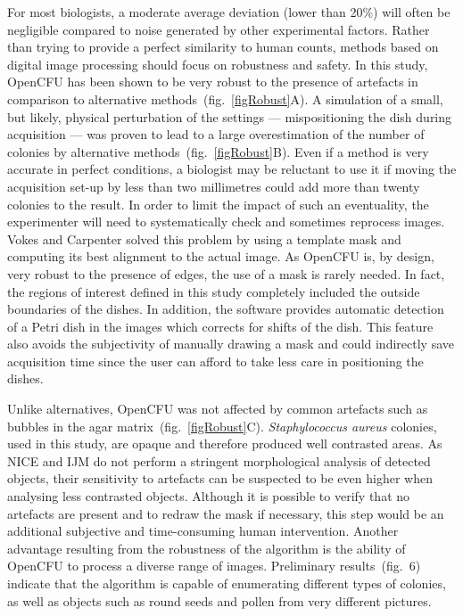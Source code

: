 \documentclass[10pt]{article}
\newcommand{\sa}{\emph{Staphylococcus aureus}}
\newcommand{\IJM}{IJM}
\begin{document}
For most biologists, a moderate average deviation (lower than 20\%) will often be
negligible compared to noise generated by other experimental factors.
Rather than trying to provide a perfect similarity to human counts, methods
based on digital image processing should focus on robustness and safety.
In this study, OpenCFU has been shown to be very robust to the presence of
artefacts in comparison to alternative methods~(fig.~\ref{figRobust}A). A
simulation of a small, but likely, physical perturbation of the settings ---
mispositioning the dish during acquisition --- was proven to lead to a large
overestimation of the number of colonies by alternative
methods~(fig.~\ref{figRobust}B).
Even if a method is very accurate in perfect conditions, a biologist may be
reluctant to use it if moving the acquisition set-up by less than two
millimetres could add more than twenty colonies to the result.
In order to limit the impact of such an eventuality, the experimenter will need to
systematically check and sometimes reprocess images.
Vokes and Carpenter \cite{vokes_using_2008} solved this problem by using a
template mask and computing its best alignment to the actual image.
As OpenCFU is, by design, very robust to the presence of edges, the use of a mask is 
rarely needed. In fact, the regions of interest defined in this study
completely included the outside boundaries of the dishes.
In addition, the software provides automatic detection of a Petri dish
in
the images which corrects for shifts of the dish. This feature also avoids 
the
subjectivity of manually drawing a mask and could indirectly save acquisition
time since the user can afford to take less care in positioning the dishes.

Unlike alternatives, OpenCFU was not affected by common artefacts such as bubbles
 in the agar matrix~(fig.~\ref{figRobust}C).  
 \sa{} colonies, used in this study, are opaque and therefore produced well
contrasted areas. As NICE and \IJM{} do not perform a stringent
morphological analysis of detected objects, their sensitivity to artefacts can be
suspected to be even higher when analysing less contrasted objects.
Although 
it is possible to verify that no artefacts are present and to redraw the
mask if necessary, this step would be an additional subjective and
time-consuming human intervention.
Another advantage resulting from the robustness of the algorithm is the ability of OpenCFU
to process a diverse range of images.
Preliminary results~(fig.~6)
indicate that the algorithm is capable of enumerating different
types of colonies, as well as objects such as round seeds and pollen
from very different pictures.
\end{document}
